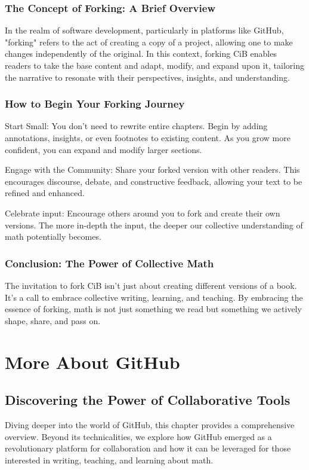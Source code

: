 \documentclass[a4paper,12pt]{book}
\begin{document}
\subsection*{The Concept of Forking: A Brief Overview}

In the realm of software development, particularly in platforms like GitHub, "forking" refers to the act of creating a copy of a project, allowing one to make changes independently of the original. In this context, forking CiB enables readers to take the base content and adapt, modify, and expand upon it, tailoring the narrative to resonate with their perspectives, insights, and understanding.

\subsection*{How to Begin Your Forking Journey}

Start Small: You don't need to rewrite entire chapters. Begin by adding annotations, insights, or even footnotes to existing content. As you grow more confident, you can expand and modify larger sections.

Engage with the Community: Share your forked version with other readers. This encourages discourse, debate, and constructive feedback, allowing your text to be refined and enhanced.

Celebrate input: Encourage others around you to fork and create their own versions. The more in-depth the input, the deeper our collective understanding of math potentially becomes.

\subsection*{Conclusion: The Power of Collective Math}

The invitation to fork CiB isn't just about creating different versions of a book. It's a call to embrace collective writing, learning, and teaching. By embracing the essence of forking, math is not just something we read but something we actively shape, share, and pass on.

\chapter{More About GitHub}
\section*{Discovering the Power of Collaborative Tools}
Diving deeper into the world of GitHub, this chapter provides a comprehensive overview. Beyond its technicalities, we explore how GitHub emerged as a revolutionary platform for collaboration and how it can be leveraged for those interested in writing, teaching, and learning about math.
\end{document}
